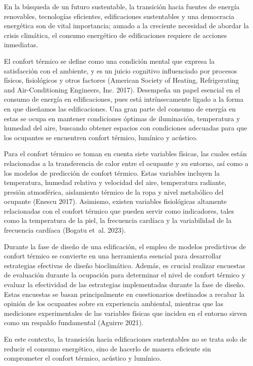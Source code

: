 \documentclass[
  letterpaper,
  DIV=11,
  numbers=noendperiod]{scrreport}
\begin{document}
En la búsqueda de un futuro sustentable, la transición hacia fuentes de
energía renovables, tecnologías eficientes, edificaciones sustentables y
una democracia energética son de vital importancia; aunado a la
creciente necesidad de abordar la crisis climática, el consumo
energético de edificaciones requiere de acciones inmediatas.

El confort térmico se define como una condición mental que expresa la
satisfacción con el ambiente, y es un juicio cognitivo influenciado por
procesos físicos, fisiológicos y otros factores (American Society of
Heating, Refrigerating and Air-Conditioning Engineers, Inc. 2017).
Desempeña un papel esencial en el consumo de energía en edificaciones,
pues está intrínsecamente ligado a la forma en que diseñamos las
edificaciones. Una gran parte del consumo de energía en estas se ocupa
en mantener condiciones óptimas de iluminación, temperatura y humedad
del aire, buscando obtener espacios con condiciones adecuadas para que
los ocupantes se encuentren confort térmico, lumínico y acústico.

Para el confort térmico se toman en cuenta siete variables físicas, las
cuales están relacionadas a la transferencia de calor entre el ocupante
y su entorno, así como a los modelos de predicción de confort térmico.
Estas variables incluyen la temperatura, humedad relativa y velocidad
del aire, temperatura radiante, presión atmosférica, aislamiento térmico
de la ropa y nivel metabólico del ocupante (Enescu 2017). Asimismo,
existen variables fisiológicas altamente relacionadas con el confort
térmico que pueden servir como indicadores, tales como la temperatura de
la piel, la frecuencia cardíaca y la variabilidad de la frecuencia
cardíaca (Bogatu et~al. 2023).

Durante la fase de diseño de una edificación, el empleo de modelos
predictivos de confort térmico se convierte en una herramienta esencial
para desarrollar estrategias efectivas de diseño bioclimático. Además,
es crucial realizar encuestas de evaluación durante la ocupación para
determinar el nivel de confort térmico y evaluar la efectividad de las
estrategias implementadas durante la fase de diseño. Estas encuestas se
basan principalmente en cuestionarios destinados a recabar la opinión de
los ocupantes sobre su experiencia ambiental, mientras que las
mediciones experimentales de las variables físicas que inciden en el
entorno sirven como un respaldo fundamental (Aguirre 2021).

En este contexto, la transición hacia edificaciones sustentables no se
trata solo de reducir el consumo energético, sino de hacerlo de manera
eficiente sin comprometer el confort térmico, acústico y lumínico.
\end{document}
